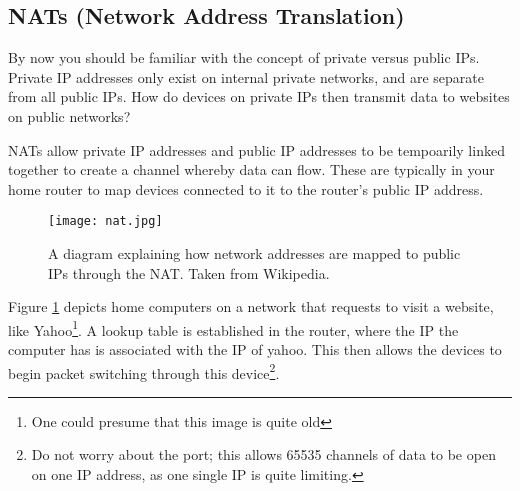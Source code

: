 \documentclass[../main.tex]{subfiles}
\begin{document}
\subsection{NATs (Network Address Translation)}
\label{2:sec:nats}

By now you should be familiar with the concept of private versus public IPs. Private IP addresses only exist on internal private networks, and are separate from all public IPs. How do devices on private IPs then transmit data to websites on public networks?

NATs allow private IP addresses and public IP addresses to be tempoarily linked together to create a channel whereby data can flow. These are typically in your home router to map devices connected to it to the router's public IP address.

\begin{figure}[h]
    \centering
    \texttt{[image: nat.jpg]}
    \caption{A diagram explaining how network addresses are mapped to public IPs through the NAT. Taken from Wikipedia.}
    \label{fig:nat}
\end{figure}

Figure \ref{fig:nat} depicts home computers on a network that requests to visit a website, like Yahoo\footnote{One could presume that this image is quite old}. A lookup table is established in the router, where the IP the computer has is associated with the IP of yahoo. This then allows the devices to begin packet switching through this device\footnote{Do not worry about the port; this allows 65535 channels of data to be open on one IP address, as one single IP is quite limiting.}.
\end{document}
